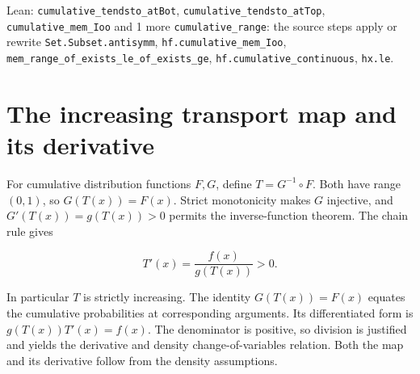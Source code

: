 \documentclass[11pt,a4paper]{article}
\begin{document}
\begin{leanbox}{Lean: \texttt{cumulative\_\allowbreak{}tendsto\_\allowbreak{}atBot}, \texttt{cumulative\_\allowbreak{}tendsto\_\allowbreak{}atTop}, \texttt{cumulative\_\allowbreak{}mem\_\allowbreak{}Ioo} and 1 more}
\texttt{cumulative\_\allowbreak{}range}: the source steps apply or rewrite \texttt{Set.\allowbreak{}Subset.\allowbreak{}antisymm}, \texttt{hf.\allowbreak{}cumulative\_\allowbreak{}mem\_\allowbreak{}Ioo}, \texttt{mem\_\allowbreak{}range\_\allowbreak{}of\_\allowbreak{}exists\_\allowbreak{}le\_\allowbreak{}of\_\allowbreak{}exists\_\allowbreak{}ge}, \texttt{hf.\allowbreak{}cumulative\_\allowbreak{}continuous}, \texttt{hx.\allowbreak{}le}.
\end{leanbox}

\section{\texorpdfstring{The increasing transport map and its derivative}{The increasing transport map and its derivative}}


For cumulative distribution functions \(F,G\), define \(T=G^{-1}\circ F\). Both have range \((0,1)\), so \(G(T(x))=F(x)\). Strict monotonicity makes \(G\) injective, and \(G'(T(x))=g(T(x))>0\) permits the inverse-function theorem. The chain rule gives

\[T'(x)=\frac{f(x)}{g(T(x))}>0.\]

In particular \(T\) is strictly increasing. The identity \(G(T(x))=F(x)\) equates the cumulative probabilities at corresponding arguments. Its differentiated form is \(g(T(x))T'(x)=f(x)\). The denominator is positive, so division is justified and yields the derivative and density change-of-variables relation. Both the map and its derivative follow from the density assumptions.
\end{document}
